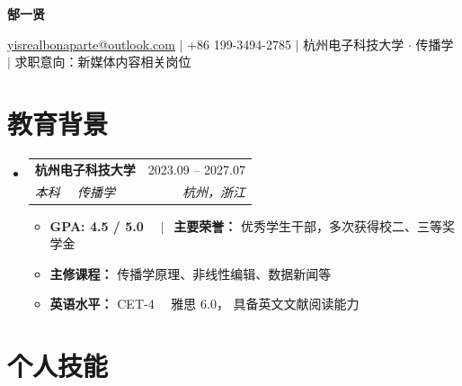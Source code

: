 \documentclass[a4paper,11pt]{article}
\makeatletter
\newcommand{\resumeItem}[1]{
  \item\small{{#1 \vspace{-1pt}}}
}
\newcommand{\resumeEducationHeading}[4]{
  \vspace{-2pt}\item
    \begin{tabular*}{0.97\textwidth}[t]{l@{\extracolsep{\fill}}r}
      \textbf{#1} & #2 \\
      \textit{\small #3} & \textit{\small #4} \\
    \end{tabular*}\vspace{-5pt}
}
\newcommand{\resumeSubHeadingListStart}{
\begin{itemize}[leftmargin=0.15in, label={}]
}
\newcommand{\resumeSubHeadingListEnd}{
\end{itemize}
}
\newcommand{\resumeItemListStart}{
\begin{itemize}[leftmargin=*, label={\small\textbullet}]
}
\newcommand{\resumeItemListEnd}{
\end{itemize}\vspace{-2pt}
}
\makeatother
\begin{document}

\begin{center}
    \textbf{\Huge { 郜一贤}} \\ \vspace{8pt}

    \small
    \href{mailto:yisrealbonaparte@outlook.com}
    {\underline{yisrealbonaparte@outlook.com}}
    $|$
    +86 199-3494-2785
    $|$
    杭州电子科技大学 $\cdot$ 传播学
    $|$
    求职意向：新媒体内容相关岗位
\end{center}


\section{教育背景}

\resumeSubHeadingListStart

\resumeEducationHeading
{杭州电子科技大学}{2023.09 -- 2027.07}
{本科 \ \textbar \ 传播学}{杭州，浙江}

\resumeItemListStart
    \resumeItem{
        \textbf{GPA: 4.5 / 5.0}
        \ \ $|\ \ $
        \textbf{主要荣誉：}
        优秀学生干部，多次获得校二、三等奖学金
    }

    \resumeItem{
        \textbf{主修课程：}
        传播学原理、非线性编辑、数据新闻等
    }

    \resumeItem{
        \textbf{英语水平：}
        CET-4 \ \textbar \ 雅思 6.0，
        具备英文文献阅读能力
    }
\resumeItemListEnd

\resumeSubHeadingListEnd


\section{个人技能}
\end{document}
